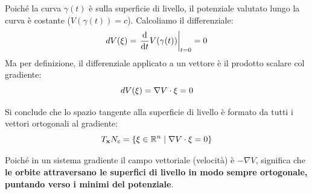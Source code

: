 \documentclass[openany]{book}
\theoremstyle{definition}
\theoremstyle{remark}
\newcommand{\R}{\mathbb{R}}
\begin{document}
\begin{figure}
\vspace{-15pt}
\begin{center}
\end{center}
\vspace{-15pt}
\end{figure}

Poiché la curva $\gamma(t)$ è sulla superficie di livello, il potenziale valutato lungo la curva è costante ($V(\gamma(t)) = c$). Calcoliamo il differenziale:
\begin{equation*}
    dV(\vb{\xi}) = \eval{ \dv{t} V(\gamma(t)) }_{t=0} = 0
\end{equation*}
Ma per definizione, il differenziale applicato a un vettore è il prodotto scalare col gradiente:
\begin{equation*}
    dV(\vb{\xi}) = \nabla V \cdot \vb{\xi} = 0
\end{equation*}

Si conclude che lo spazio tangente alla superficie di livello è formato da tutti i vettori ortogonali al gradiente:
\begin{equation}
    T_{\vb{x}} N_c = \{ \vb{\xi} \in \R^n \mid \nabla V \cdot \vb{\xi} = 0 \}
\end{equation}

Poiché in un sistema gradiente il campo vettoriale (velocità) è $-\nabla V$, significa che \textbf{le orbite attraversano le superfici di livello in modo sempre ortogonale, puntando verso i minimi del potenziale}.
\end{document}
